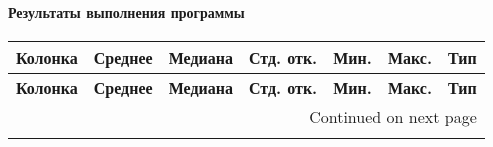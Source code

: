 \documentclass[12pt,a4paper]{article}
\begin{document}
  \setlength\LTleft{-2.5cm}
  \setlength\LTright{-2.5cm}
  \paragraph*{Результаты выполнения программы}
  \begin{longtable}{l|rrrrr|l}
    \toprule
    \textbf{Колонка} & \textbf{Среднее} & \textbf{Медиана} & \textbf{Стд. отк.} & \textbf{Мин.} & \textbf{Макс.} & \textbf{Тип} \\
    \midrule
    \endfirsthead

    \toprule
    \textbf{Колонка} & \textbf{Среднее} & \textbf{Медиана} & \textbf{Стд. отк.} & \textbf{Мин.} & \textbf{Макс.} & \textbf{Тип} \\
    \midrule
    \endhead
    \midrule
    \multicolumn{7}{r}{{Continued on next page}} \\
    \midrule
    \endfoot


\end{longtable}
\end{document}

